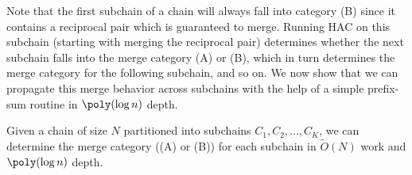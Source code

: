 Note that the first subchain of a chain will always fall into category (B) since it contains a reciprocal pair which is guaranteed to merge.
Running HAC on this subchain (starting with merging the reciprocal pair) determines whether the next subchain falls into the merge category (A) or (B), which in turn determines the merge category for the following subchain, and so on. 
We now show that we can propagate this merge behavior across subchains with the help of a simple prefix-sum routine in $\poly(\log n)$ depth.

\begin{lemma}\label{lem:path_prefix_sum}
    Given a chain of size $N$ partitioned into subchains $C_1,C_2,\ldots,C_K$, we can determine the merge category ((A) or (B)) for each subchain in $\tilde{O}(N)$ work and $\poly(\log n)$ depth.
\end{lemma}

